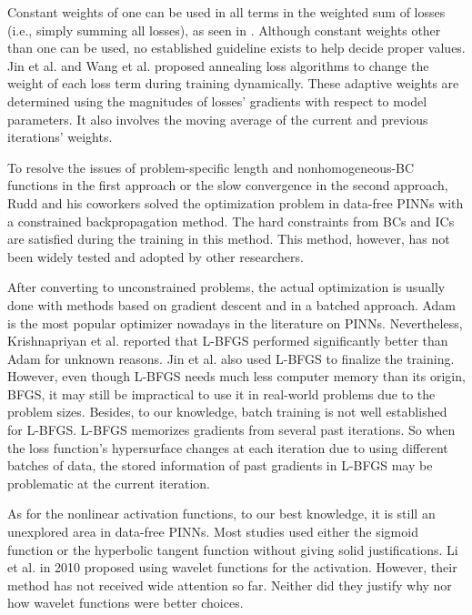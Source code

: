Constant weights of one can be used in all terms in the weighted sum of losses (i.e., simply summing all losses), as seen in \cite{lagaris_artificial_1998,sirignano_dgm:_2018,dockhorn_discussion_2019}.
Although constant weights other than one can be used, no established guideline exists to help decide proper values.
Jin et al. \cite{jin_nsfnets_2020} and Wang et al. \cite{wang_understanding_2021} proposed annealing loss algorithms to change the weight of each loss term during training dynamically.
These adaptive weights are determined using the magnitudes of losses' gradients with respect to model parameters.
It also involves the moving average of the current and previous iterations' weights.

To resolve the issues of problem-specific length and nonhomogeneous-BC functions in the first approach or the slow convergence in the second approach, Rudd and his coworkers \cite{rudd_constrained_2014,rudd_constrained_2015} solved the optimization problem in data-free PINNs with a constrained backpropagation method.
The hard constraints from BCs and ICs are satisfied during the training in this method.
This method, however, has not been widely tested and adopted by other researchers.

After converting to unconstrained problems, the actual optimization is usually done with methods based on gradient descent and in a batched approach. 
Adam \cite{kingma_adam_2017} is the most popular optimizer nowadays in the literature on PINNs.
Nevertheless, Krishnapriyan et al. \cite{krishnapriyan_characterizing_2021} reported that L-BFGS performed significantly better than Adam for unknown reasons.
Jin et al. \cite{jin_nsfnets_2020} also used L-BFGS to finalize the training.
However, even though L-BFGS needs much less computer memory than its origin, BFGS, it may still be impractical to use it in real-world problems due to the problem sizes.
Besides, to our knowledge, batch training is not well established for L-BFGS.
L-BFGS memorizes gradients from several past iterations.
So when the loss function's hypersurface changes at each iteration due to using different batches of data, the stored information of past gradients in L-BFGS may be problematic at the current iteration.

As for the nonlinear activation functions, to our best knowledge, it is still an unexplored area in data-free PINNs.
Most studies used either the sigmoid function or the hyperbolic tangent function without giving solid justifications.
Li et al. \cite{li_integration_2010} in 2010 proposed using wavelet functions for the activation.
However, their method has not received wide attention so far.
Neither did they justify why nor how wavelet functions were better choices.
